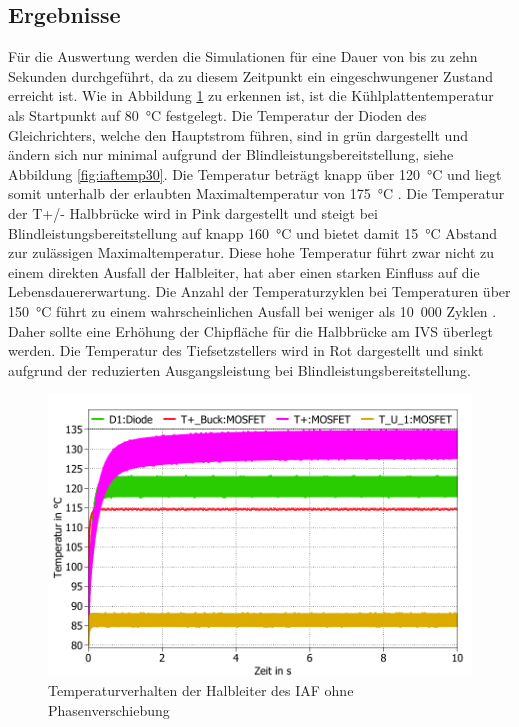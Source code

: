 		\subsection{Ergebnisse}
		Für die Auswertung werden die Simulationen für eine Dauer von bis zu zehn Sekunden durchgeführt, da zu diesem Zeitpunkt ein eingeschwungener Zustand erreicht ist. Wie in Abbildung \ref{fig:iaftemp0} zu erkennen ist, ist die Kühlplattentemperatur als Startpunkt auf 80~°C festgelegt. Die Temperatur der Dioden des Gleichrichters, welche den Hauptstrom führen, sind in grün dargestellt und ändern sich nur minimal aufgrund der Blindleistungsbereitstellung, siehe Abbildung \ref{fig:iaftemp30}. Die Temperatur beträgt knapp über 120~°C und liegt somit unterhalb der erlaubten Maximaltemperatur von 175~°C \cite{IFAGFF2}. Die Temperatur der T+/- Halbbrücke wird in Pink dargestellt und steigt bei Blindleistungsbereitstellung auf knapp 160~°C und bietet damit 15~°C Abstand zur zulässigen Maximaltemperatur.  Diese hohe Temperatur führt zwar nicht zu einem direkten Ausfall der Halbleiter, hat aber einen starken Einfluss auf die Lebensdauererwartung. Die Anzahl der Temperaturzyklen bei Temperaturen über 150~°C führt zu einem wahrscheinlichen Ausfall bei weniger als 10~000 Zyklen \cite{SicTemp}. Daher sollte eine Erhöhung der Chipfläche für die Halbbrücke am \gls{IVS} überlegt werden. Die Temperatur des Tiefsetzstellers wird in Rot dargestellt und sinkt aufgrund der reduzierten Ausgangsleistung bei Blindleistungsbereitstellung.  
		\begin{figure} 
			\centering
			\includegraphics[width=0.9\linewidth]{content/Grafiken/IAF_Temp_0Grad}
			
			
			\caption{Temperaturverhalten der Halbleiter des IAF ohne Phasenverschiebung}
			\label{fig:iaftemp0}
		\end{figure}
		

